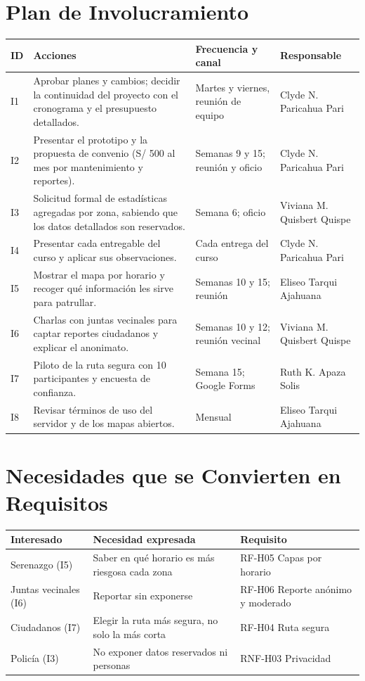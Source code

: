 \documentclass[11pt,a4paper]{article}
\begin{document}
\section{Plan de Involucramiento}
{\small
{}
\noindent\begin{tabularx}{\textwidth}{@{}C{0.6cm} L P{2.4cm} P{2.3cm}@{}}
\toprule
{}
\textbf{ID} & \textbf{Acciones} & \textbf{Frecuencia y canal} & \textbf{Responsable} \\
\midrule
I1 & Aprobar planes y cambios; decidir la continuidad del proyecto con el cronograma y el presupuesto detallados. & Martes y viernes, reunión de equipo & Clyde N. Paricahua Pari \\
I2 & Presentar el prototipo y la propuesta de convenio (S/ 500 al mes por mantenimiento y reportes). & Semanas 9 y 15; reunión y oficio & Clyde N. Paricahua Pari \\
I3 & Solicitud formal de estadísticas agregadas por zona, sabiendo que los datos detallados son reservados. & Semana 6; oficio & Viviana M. Quisbert Quispe \\
I4 & Presentar cada entregable del curso y aplicar sus observaciones. & Cada entrega del curso & Clyde N. Paricahua Pari \\
I5 & Mostrar el mapa por horario y recoger qué información les sirve para patrullar. & Semanas 10 y 15; reunión & Eliseo Tarqui Ajahuana \\
I6 & Charlas con juntas vecinales para captar reportes ciudadanos y explicar el anonimato. & Semanas 10 y 12; reunión vecinal & Viviana M. Quisbert Quispe \\
I7 & Piloto de la ruta segura con 10 participantes y encuesta de confianza. & Semana 15; Google Forms & Ruth K. Apaza Solis \\
I8 & Revisar términos de uso del servidor y de los mapas abiertos. & Mensual & Eliseo Tarqui Ajahuana \\
\bottomrule
\end{tabularx}
}

\section{Necesidades que se Convierten en Requisitos}
{\small
{}
\noindent\begin{tabularx}{\textwidth}{@{}P{3.2cm} L P{2.6cm}@{}}
\toprule
{}
\textbf{Interesado} & \textbf{Necesidad expresada} & \textbf{Requisito} \\
\midrule
Serenazgo (I5) & Saber en qué horario es más riesgosa cada zona & RF-H05 Capas por horario \\
Juntas vecinales (I6) & Reportar sin exponerse & RF-H06 Reporte anónimo y moderado \\
Ciudadanos (I7) & Elegir la ruta más segura, no solo la más corta & RF-H04 Ruta segura \\
Policía (I3) & No exponer datos reservados ni personas & RNF-H03 Privacidad \\
\bottomrule
\end{tabularx}
}
\end{document}
